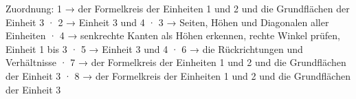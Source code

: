 
Zuordnung: 1 → der Formelkreis der Einheiten 1 und 2 und die Grundflächen der Einheit 3 · 2 → Einheit 3 und 4 · 3 → Seiten, Höhen und Diagonalen aller Einheiten · 4 → senkrechte Kanten als Höhen erkennen, rechte Winkel prüfen, Einheit 1 bis 3 · 5 → Einheit 3 und 4 · 6 → die Rückrichtungen und Verhältnisse · 7 → der Formelkreis der Einheiten 1 und 2 und die Grundflächen der Einheit 3 · 8 → der Formelkreis der Einheiten 1 und 2 und die Grundflächen der Einheit 3

